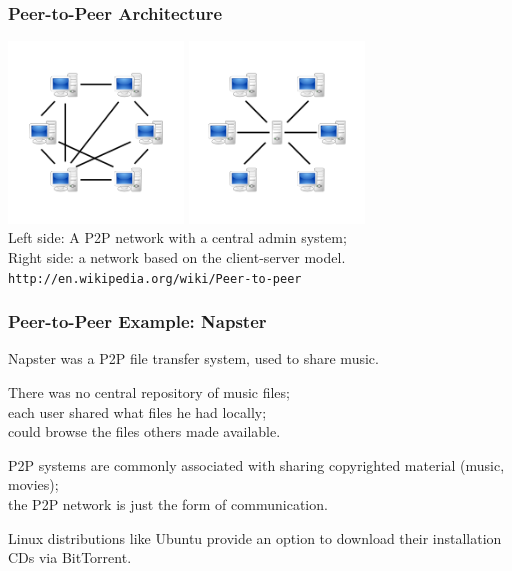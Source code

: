 \begin{frame}
\frametitle{Peer-to-Peer Architecture}

\begin{changemargin}{1cm}
\begin{center}
\includegraphics[width=0.35\textwidth]{images/p2pnetwork.png}
\includegraphics[width=0.35\textwidth]{images/serverbased.png}\\
Left side: A P2P network with a central admin system;\\
Right side: a network based on the client-server model.\\
\texttt{http://en.wikipedia.org/wiki/Peer-to-peer}
\end{center}


\end{changemargin}
\end{frame}

\begin{frame}
\frametitle{Peer-to-Peer Example: Napster}

\begin{changemargin}{1cm}
Napster was a P2P file transfer system, used to share music. 

There was no central repository of music files;\\
\quad each user shared what files he had locally;\\
\quad could browse the files others made available. 

P2P systems are commonly associated with sharing copyrighted material (music, movies);\\
\quad the P2P network is just the form of communication. 

Linux distributions like Ubuntu provide an option to download their installation CDs via BitTorrent.

\end{changemargin}
\end{frame}


